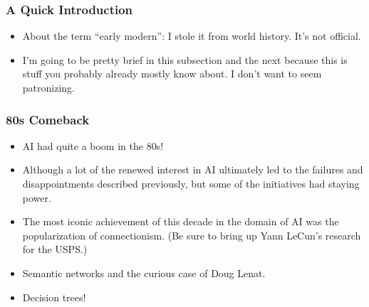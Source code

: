 \documentclass{beamer}
\begin{document}
  \begin{frame}
    \frametitle{A Quick Introduction}

    \begin{itemize}
      \item About the term ``early modern'': I stole it from world history.
        It's not official.
      \pause
      \item I'm going to be pretty brief in this subsection and the next
        because this is stuff you probably already mostly know about. I don't
        want to seem patronizing.
    \end{itemize}
  \end{frame}

  \begin{frame}
    \frametitle{80s Comeback}

    \begin{itemize}
      \item AI had quite a boom in the 80s!
      \pause
      \item Although a lot of the renewed interest in AI ultimately led to the
        failures and disappointments described previously, but some of the
        initiatives had staying power.
      \pause
      \item The most iconic achievement of this decade in the domain of AI was
        the popularization of connectionism. (Be sure to bring up Yann LeCun's
        research for the USPS.)
      \pause
      \item Semantic networks and the curious case of Doug Lenat.
      \pause
      \item Decision trees!
    \end{itemize}
  \end{frame}
\end{document}
